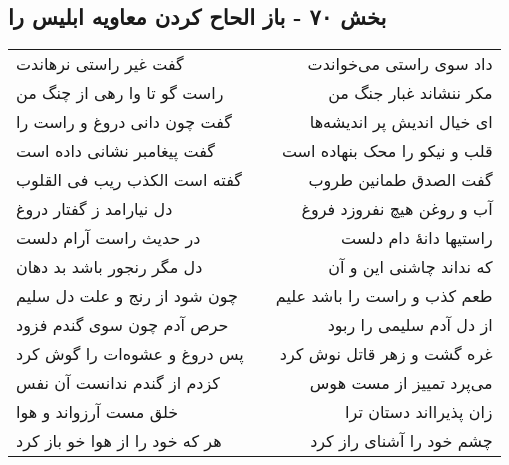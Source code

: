 \begin{center}
\section*{بخش ۷۰ - باز الحاح کردن معاویه ابلیس را}
\label{sec:sh070}
\begin{longtable}{l p{0.5cm} r}
گفت غیر راستی نرهاندت
&&
داد سوی راستی می‌خواندت
\\
راست گو تا وا رهی از چنگ من
&&
مکر ننشاند غبار جنگ من
\\
گفت چون دانی دروغ و راست را
&&
ای خیال اندیش پر اندیشه‌ها
\\
گفت پیغامبر نشانی داده است
&&
قلب و نیکو را محک بنهاده است
\\
گفته است الکذب ریب فی القلوب
&&
گفت الصدق طمانین طروب
\\
دل نیارامد ز گفتار دروغ
&&
آب و روغن هیچ نفروزد فروغ
\\
در حدیث راست آرام دلست
&&
راستیها دانهٔ دام دلست
\\
دل مگر رنجور باشد بد دهان
&&
که نداند چاشنی این و آن
\\
چون شود از رنج و علت دل سلیم
&&
طعم کذب و راست را باشد علیم
\\
حرص آدم چون سوی گندم فزود
&&
از دل آدم سلیمی را ربود
\\
پس دروغ و عشوه‌ات را گوش کرد
&&
غره گشت و زهر قاتل نوش کرد
\\
کزدم از گندم ندانست آن نفس
&&
می‌پرد تمییز از مست هوس
\\
خلق مست آرزواند و هوا
&&
زان پذیرااند دستان ترا
\\
هر که خود را از هوا خو باز کرد
&&
چشم خود را آشنای راز کرد
\\
\end{longtable}
\end{center}

